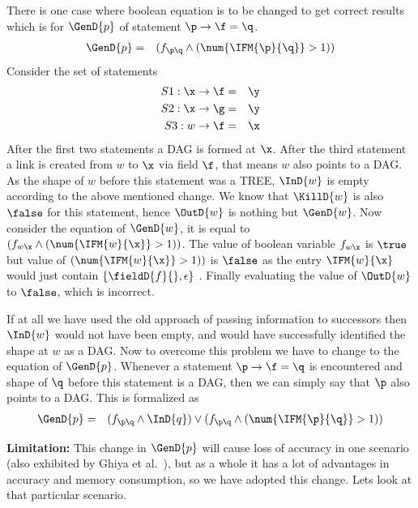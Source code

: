 There is one case where boolean equation is to be changed to get correct results 
which is for $\GenD{p}$ of statement $\p \rightarrow \f =\q$.
\begin{eqnarray*}
	  \GenD{p}   &=&  ( f_{\p\q} \wedge (\num{\IFM{\p}{\q}} > 1) )
\end{eqnarray*}
Consider the set of statements  
\begin{eqnarray*}
  S1: \x \rightarrow \f &=& \y \\
  S2: \x \rightarrow \g &=& \y  \\
  S3: w \rightarrow \f &=& \x 
\end{eqnarray*}
After the first two statements a DAG is formed at $\x$. After the third statement a link is created from  $w$ to $\x$ via field $\f$, that means $w$ also points to a DAG. 
As the shape of $w$ before this statement was a TREE, $\InD{w}$ is empty according to the above mentioned change. We know that $\KillD{w}$ is also $\false$ for this statement, 
hence $\OutD{w}$ is nothing but $\GenD{w}$. Now consider the equation of $\GenD{w}$, it is equal to $( f_{w\x} \wedge (\num{\IFM{w}{\x}} > 1) )$. The value of 
boolean variable $f_{w\x}$ is $\true$ but value of $(\num{\IFM{w}{\x}} > 1) )$ is $\false $ as the entry $\IFM{w}{\x}$ would just contain 
$\{ \fieldD{f}{} , \epsilon \}$ . Finally evaluating the value of $\OutD{w}$ to $\false$, which is incorrect.
  
If at all we have used the old approach of passing information to successors then $\InD{w}$ would not have been empty, and would have successfully identified
the shape at $w$ as a DAG. Now to overcome this problem we have to change to the equation of $\GenD{p}$. Whenever a statement $\p \rightarrow \f = \q$ is
encountered and shape of $\q$ before this statement is a DAG, then we can simply say that $\p$ also points to a DAG. This is formalized as
\begin{eqnarray*}
	  \GenD{p}   &=&  (f_{\p\q} \wedge \InD{q}) \vee ( f_{\p\q} \wedge (\num{\IFM{\p}{\q}} > 1) )
\end{eqnarray*}

\textbf{Limitation: }This change in $\GenD{p}$ will cause loss of accuracy in one scenario (also exhibited by Ghiya et al.~\cite{Ghiya96}), but 
as a whole it has a lot of advantages in accuracy and memory consumption, so we have adopted this change. Lets look at that particular scenario.

